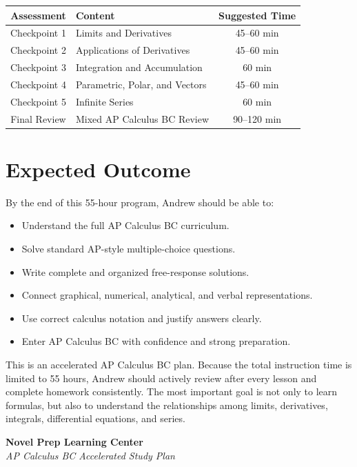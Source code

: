 \documentclass[11pt]{article}
\begin{document}
\begin{tabularx}{\textwidth}{|c|X|c|}
\hline
\rowcolor{LightPurple}
\textbf{Assessment} & \textbf{Content} & \textbf{Suggested Time} \\
\hline
Checkpoint 1 & Limits and Derivatives & 45--60 min \\
\hline
Checkpoint 2 & Applications of Derivatives & 45--60 min \\
\hline
Checkpoint 3 & Integration and Accumulation & 60 min \\
\hline
Checkpoint 4 & Parametric, Polar, and Vectors & 45--60 min \\
\hline
Checkpoint 5 & Infinite Series & 60 min \\
\hline
Final Review & Mixed AP Calculus BC Review & 90--120 min \\
\hline
\end{tabularx}

\section*{Expected Outcome}

By the end of this 55-hour program, Andrew should be able to:
\begin{itemize}
    \item Understand the full AP Calculus BC curriculum.
    \item Solve standard AP-style multiple-choice questions.
    \item Write complete and organized free-response solutions.
    \item Connect graphical, numerical, analytical, and verbal representations.
    \item Use correct calculus notation and justify answers clearly.
    \item Enter AP Calculus BC with confidence and strong preparation.
\end{itemize}

\begin{tcolorbox}[colback=LightPurple, colframe=NovelPurple, title=\textbf{Teacher Note}]
This is an accelerated AP Calculus BC plan. Because the total instruction time is limited to 55 hours, Andrew should actively review after every lesson and complete homework consistently. The most important goal is not only to learn formulas, but also to understand the relationships among limits, derivatives, integrals, differential equations, and series.
\end{tcolorbox}

\vfill

\begin{center}
\textbf{\color{NovelPurple}Novel Prep Learning Center}\\
\textit{AP Calculus BC Accelerated Study Plan}
\end{center}
\end{document}
